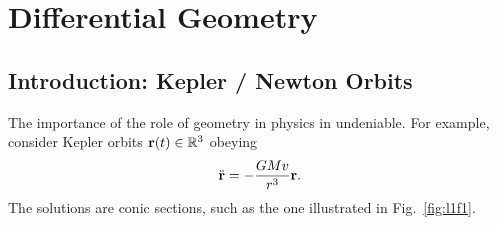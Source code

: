 
\chapter{Differential Geometry}%
\label{cha:differential_geometry}

\section{Introduction: Kepler / Newton Orbits}%
\label{sec:kepler_newton_orbits}

The importance of the role of geometry in physics in undeniable.
For example, consider Kepler orbits $\vb{r}(t) \in \mathbb{R}^3$ obeying
\begin{equation}
  \ddot{\vb{r}} = -\frac{G M v}{r^3} \vb{r}.
\end{equation}
The solutions are conic sections, such as the one illustrated in Fig.~\ref{fig:l1f1}.

